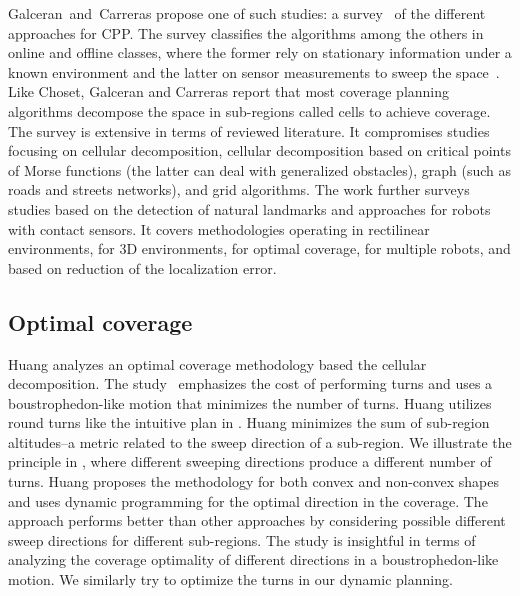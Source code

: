 Galceran~and~Carreras propose one of such studies: a survey~\citep{galceran2013survey} of the different approaches for CPP. The survey classifies the algorithms among the others in online and offline classes, where the former rely on stationary information under a known environment and the latter on sensor measurements to sweep the space~\citep{galceran2013survey}. Like Choset, Galceran and Carreras report that most coverage planning algorithms decompose the space in sub-regions called cells to achieve coverage. The survey is extensive in terms of reviewed literature. It compromises studies focusing on cellular decomposition, cellular decomposition based on critical points of Morse functions (the latter can deal with generalized obstacles), graph (such as roads and streets networks), and grid algorithms. The work further surveys studies based on the detection of natural landmarks and approaches for robots with contact sensors. It covers methodologies operating in rectilinear environments, for 3D environments, for optimal coverage, for multiple robots, and based on reduction of the localization error.

\subsection{Optimal coverage}
\label{sec:opti-cov}

Huang analyzes an optimal coverage methodology based the cellular decomposition. The study~\citep{huang2001optimal} emphasizes the cost of performing turns and uses a boustrophedon-like motion that minimizes the number of turns. Huang utilizes round turns like the intuitive plan in . Huang minimizes the sum of sub-region altitudes--a metric related to the sweep direction of a sub-region. We illustrate the principle in , where different sweeping directions produce a different number of turns. Huang proposes the methodology for both convex and non-convex shapes and uses dynamic programming for the optimal direction in the coverage. The approach performs better than other approaches by considering possible different sweep directions for different sub-regions. The study is insightful in terms of analyzing the coverage optimality of different directions in a boustrophedon-like motion. We similarly try to optimize the turns in our dynamic planning.

